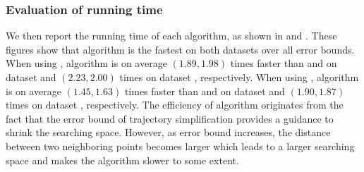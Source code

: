\subsubsection {Evaluation of running time}
We then report the running time of each algorithm, as shown in  and . These figures show that algorithm \stmm is the fastest on both datasets over all error bounds.
When using \sed, algorithm \stmm is on average {$(1.89, 1.98)$} times faster than \hmmbased
and \gfbased on dataset \pubdata and {$(2.23, 2.00)$} times on dataset \sercar, respectively.
When using \ped, algorithm \stmm is on average {$(1.45, 1.63)$} times faster than \hmmbased
and \gfbased on dataset \pubdata and {$(1.90, 1.87)$} times on dataset \sercar, respectively.
%
The efficiency of algorithm \stmm originates from the fact that the error
bound of trajectory simplification provides a guidance to shrink the searching
space.
However, as error bound increases, the distance between two neighboring points
becomes larger which leads to a larger searching space and makes the algorithm slower to some extent.





